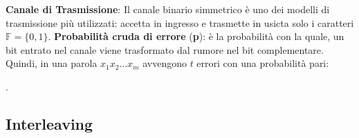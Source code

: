 \begin{flushleft}
    \textbf{Canale di Trasmissione}: Il canale binario simmetrico è uno dei modelli di trasmissione più utilizzati: accetta in ingresso e trasmette in usicta solo i caratteri $\mathbb{F} = \{0, 1\}$. \textbf{Probabilità cruda di errore} (\textbf{p}): è la probabilità con la quale, un bit entrato nel canale viene trasformato dal rumore nel bit complementare. Quindi, in una parola $x_1x_2...x_m$ avvengono $t$ errori con una probabilità pari:
    
    {\centering
        .
    \par}
\end{flushleft}

\newpage
\subsection{Interleaving}
